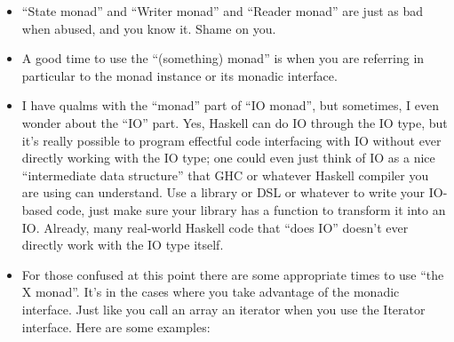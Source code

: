 \documentclass[]{article}
\begin{document}
\begin{itemize}
\item
  ``State monad'' and ``Writer monad'' and ``Reader monad'' are just as
  bad when abused, and you know it. Shame on you.
\item
  A good time to use the ``(something) monad'' is when you are referring
  in particular to the monad instance or its monadic interface.
\item
  I have qualms with the ``monad'' part of ``IO monad'', but sometimes,
  I even wonder about the ``IO'' part. Yes, Haskell can do IO through
  the IO type, but it's really possible to program effectful code
  interfacing with IO without ever directly working with the IO type;
  one could even just think of IO as a nice ``intermediate data
  structure'' that GHC or whatever Haskell compiler you are using can
  understand. Use a library or DSL or whatever to write your IO-based
  code, just make sure your library has a function to transform it into
  an IO. Already, many real-world Haskell code that ``does IO'' doesn't
  ever directly work with the IO type itself.
\item
  For those confused at this point there are some appropriate times to
  use ``the X monad''. It's in the cases where you take advantage of the
  monadic interface. Just like you call an array an iterator when you
  use the Iterator interface. Here are some examples:


\end{itemize}
\end{document}

